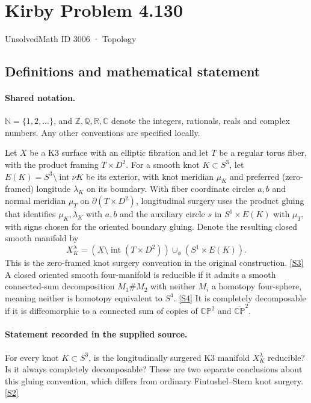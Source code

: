 \documentclass[11pt]{article}
\newcommand{\sref}[2]{\hyperlink{source:#1:#2}{[S#2]}}
\begin{document}
\setcounter{section}{3005}
\section{Kirby Problem 4.130}\label{3006}
{\small\sffamily UnsolvedMath ID 3006 · Topology}
\subsection{Definitions and mathematical statement}

\paragraph{Shared notation.}$\mathbb N=\{1,2,\ldots\}$, and $\mathbb Z,\mathbb Q,\mathbb R,\mathbb C$ denote the integers, rationals, reals and complex numbers. Any other conventions are specified locally.


Let $X$ be a K3 surface with an elliptic fibration and let $T$ be a regular torus fiber, with the product framing $T\times D^2$. For a smooth knot $K\subset S^3$, let $E(K)=S^3\setminus\operatorname{int}\nu K$ be its exterior, with knot meridian $\mu_K$ and preferred (zero-framed) longitude $\lambda_K$ on its boundary. With fiber coordinate circles $a,b$ and normal meridian $\mu_T$ on $\partial(T\times D^2)$, longitudinal surgery uses the product gluing that identifies $\mu_K,\lambda_K$ with $a,b$ and the auxiliary circle $s$ in $S^1\times E(K)$ with $\mu_T$, with signs chosen for the oriented boundary gluing. Denote the resulting closed smooth manifold by
\[
 X_K^\lambda=(X\setminus\operatorname{int}(T\times D^2))\cup_\phi(S^1\times E(K)).
\]
This is the zero-framed knot surgery convention in the original construction. \sref{3006}{3}
A closed oriented smooth four-manifold is reducible if it admits a smooth connected-sum decomposition $M_1\# M_2$ with neither $M_i$ a homotopy four-sphere, meaning neither is homotopy equivalent to $S^4$. \sref{3006}{4} It is completely decomposable if it is diffeomorphic to a connected sum of copies of $\mathbb{CP}^2$ and $\overline{\mathbb{CP}}^{2}$.
\paragraph{Statement recorded in the supplied source.}
For every knot $K\subset S^3$, is the longitudinally surgered K3 manifold $X_K^\lambda$ reducible? Is it always completely decomposable? These are two separate conclusions about this gluing convention, which differs from ordinary Fintushel--Stern knot surgery. \sref{3006}{2}
\end{document}
